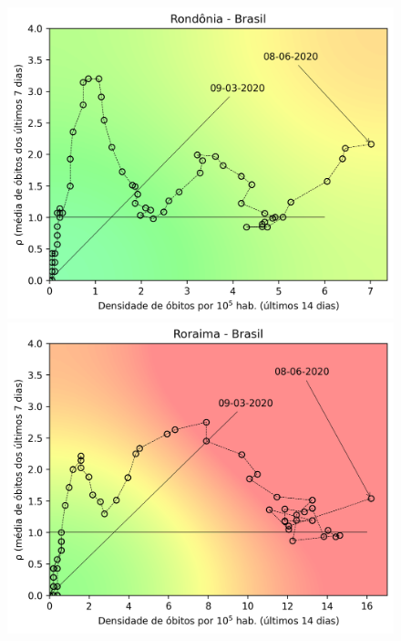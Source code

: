 \documentclass[]{article}
\begin{document}
\begin{figure}[!h]
	\begin{minipage}[t]{4cm}
		\centering
		\includegraphics[scale=0.5]{../RO.png}
	\end{minipage}
	\hspace{5cm}
	\begin{minipage}[t]{4cm}
		\centering
		\includegraphics[scale=0.5]{../RR.png}
		\vspace{0.2cm}
	\end{minipage}
	

\end{figure}
\end{document}
